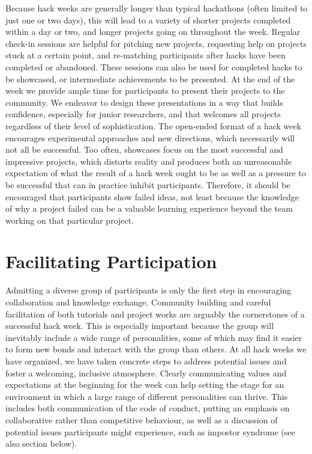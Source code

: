 \documentclass{aastex62}
\begin{document}
Because hack weeks are generally longer than typical hackathons (often limited to just one or two days), this will lead to a variety of shorter projects completed within a day or two, and longer projects going on throughout the week. Regular check-in sessions are helpful for pitching new projects, requesting help on projects stuck at a certain point, and re-matching participants after hacks have been completed or abandoned. These sessions can also be used for completed hacks to be showcased, or intermediate achievements to be presented. At the end of the week we provide ample time for participants to present their projects to the community. We endeavor to design these presentations in a way that builds confidence, especially for junior researchers, and that welcomes all projects regardless of their level of sophistication. The open-ended format of a hack week encourages experimental approaches and new directions, which necessarily will not all be successful. Too often, showcases focus on the most successful and impressive projects, which distorts reality and produces both an unreasonable expectation of what the result of a hack week ought to be as well as a pressure to be successful that can in practice inhibit participants. Therefore, it should be encouraged that participants show failed ideas, not least because the knowledge of why a project failed can be a valuable learning experience beyond the team working on that particular project.

\section{Facilitating Participation}

Admitting a diverse group of participants is only the first step in encouraging collaboration and knowledge exchange. Community building and careful facilitation of both tutorials and project works are arguably the cornerstones of a successful hack week. This is especially important because the group will inevitably include a wide range of personalities, some of which may find it easier to form new bonds and interact with the group than others. At all hack weeks we have organized, we have taken concrete steps to address potential issues and foster a welcoming, inclusive atmosphere. Clearly communicating values and expectations at the beginning for the week can help setting the stage for an environment in which a large range of different personalities can thrive. This includes both communication of the code of conduct, putting an emphasis on collaborative rather than competitive behaviour, as well as a discussion of potential issues participants might experience, such as impostor syndrome (see also section below).
\end{document}
